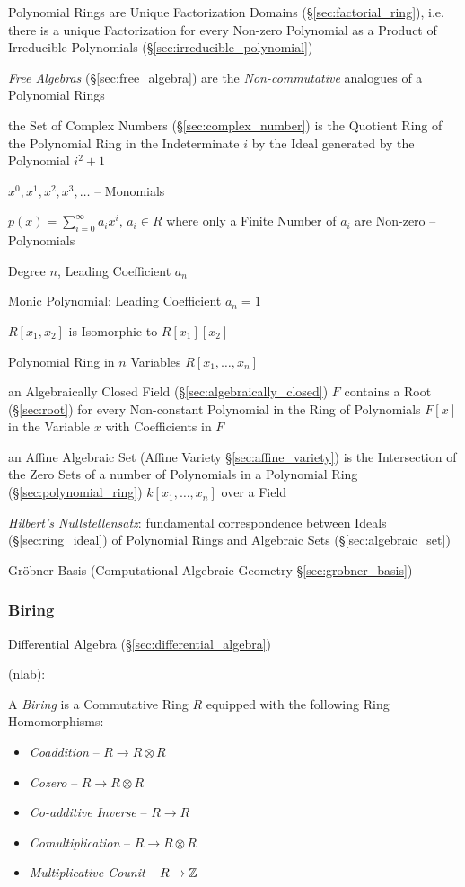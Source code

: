 Polynomial Rings are Unique Factorization Domains (\S\ref{sec:factorial_ring}),
i.e. there is a unique Factorization for every Non-zero Polynomial as a Product
of Irreducible Polynomials (\S\ref{sec:irreducible_polynomial})

\fist \emph{Free Algebras} (\S\ref{sec:free_algebra}) are the
\emph{Non-commutative} analogues of a Polynomial Rings

the Set of Complex Numbers (\S\ref{sec:complex_number}) is the Quotient Ring of
the Polynomial Ring in the Indeterminate $i$ by the Ideal generated by the
Polynomial $i^2 + 1$

$x^0, x^1, x^2, x^3, \ldots$ -- Monomials

$p(x) = \sum_{i=0}^\infty a_i x^i$, $a_i \in R$ where only a Finite Number of
$a_i$ are Non-zero -- Polynomials

Degree $n$, Leading Coefficient $a_n$

Monic Polynomial: Leading Coefficient $a_n = 1$

$R[x_1, x_2]$ is Isomorphic to $R[x_1][x_2]$

Polynomial Ring in $n$ Variables $R[x_1, \ldots, x_n]$

an Algebraically Closed Field (\S\ref{sec:algebraically_closed}) $F$ contains a
Root (\S\ref{sec:root}) for every Non-constant Polynomial in the Ring
of Polynomials $F[x]$ in the Variable $x$ with Coefficients in $F$

an Affine Algebraic Set (Affine Variety \S\ref{sec:affine_variety}) is the
Intersection of the Zero Sets of a number of Polynomials in a Polynomial Ring
(\S\ref{sec:polynomial_ring}) $k[x_1,\ldots,x_n]$ over a Field

\emph{Hilbert's Nullstellensatz}: fundamental correspondence between Ideals
(\S\ref{sec:ring_ideal}) of Polynomial Rings and Algebraic Sets
(\S\ref{sec:algebraic_set})

\fist Gr\"obner Basis (Computational Algebraic Geometry
\S\ref{sec:grobner_basis})



\subsubsection{Biring}\label{sec:biring}

\fist Differential Algebra (\S\ref{sec:differential_algebra})

(nlab):

A \emph{Biring} is a Commutative Ring $R$ equipped with the following Ring
Homomorphisms:
\begin{itemize}
  \item \emph{Coaddition} -- $R \rightarrow R \otimes R$
  \item \emph{Cozero} -- $R \rightarrow R \otimes R$
  \item \emph{Co-additive Inverse} -- $R \rightarrow R$
  \item \emph{Comultiplication} -- $R \rightarrow R \otimes R$
  \item \emph{Multiplicative Counit} -- $R \rightarrow \mathbb{Z}$
\end{itemize}

